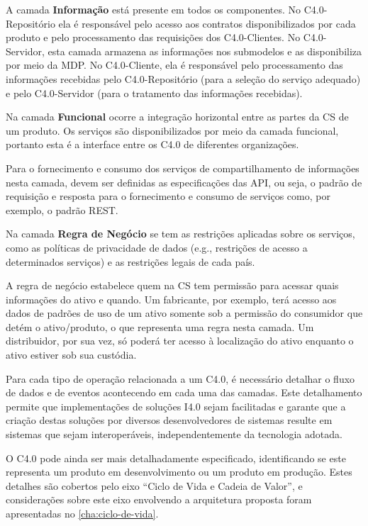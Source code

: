 A camada \textbf{Informação} está presente em todos os componentes. No C4.0-Repositório ela é responsável pelo acesso aos contratos disponibilizados por cada produto e pelo processamento das requisições dos C4.0-Clientes. No C4.0-Servidor, esta camada armazena as informações nos submodelos e as disponibiliza por meio da MDP. No C4.0-Cliente, ela é responsável pelo processamento das informações recebidas pelo C4.0-Repositório (para a seleção do serviço adequado) e pelo C4.0-Servidor (para o tratamento das informações recebidas).

Na camada \textbf{Funcional} ocorre a integração horizontal entre as partes da CS de um produto. Os serviços são disponibilizados por meio da camada funcional, portanto esta é a interface entre os C4.0 de diferentes organizações.

Para o fornecimento e consumo dos serviços de compartilhamento de informações nesta camada, devem ser definidas as especificações das API, ou seja, o padrão de requisição e resposta para o fornecimento e consumo de serviços como, por exemplo, o padrão REST.

Na camada \textbf{Regra de Negócio} se tem as restrições aplicadas sobre os serviços, como as políticas de privacidade de dados (e.g., restrições de acesso a determinados serviços) e as restrições legais de cada país.

A regra de negócio estabelece quem na CS tem permissão para acessar quais informações do ativo e quando. Um fabricante, por exemplo, terá acesso aos dados de padrões de uso de um ativo somente sob a permissão do consumidor que detém o ativo/produto, o que representa uma regra nesta camada. Um distribuidor, por sua vez, só poderá ter acesso à localização do ativo enquanto o ativo estiver sob sua custódia.

Para cada tipo de operação relacionada a um C4.0, é necessário detalhar o fluxo de dados e de eventos acontecendo em cada uma das camadas. Este detalhamento permite que implementações de soluções I4.0 sejam facilitadas e garante que a criação destas soluções por diversos desenvolvedores de sistemas resulte em sistemas que sejam interoperáveis, independentemente da tecnologia adotada.

O C4.0 pode ainda ser mais detalhadamente especificado, identificando se este representa um produto em desenvolvimento ou um produto em produção. Estes detalhes são cobertos pelo eixo ``Ciclo de Vida e Cadeia de Valor'', e considerações sobre este eixo envolvendo a arquitetura proposta foram apresentadas no \autoref{cha:ciclo-de-vida}.

